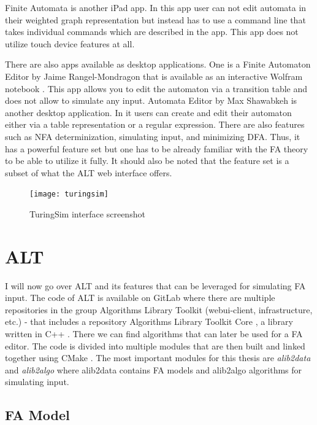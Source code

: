 Finite Automata \cite{finite-automata-app} is another iPad app. In this app user can not edit automata in their weighted graph representation but instead has to use a command line that takes individual commands which are described in the app. This app does not utilize touch device features at all.

There are also apps available as desktop applications. One is a Finite Automaton Editor by Jaime Rangel-Mondragon that is available as an interactive Wolfram notebook \cite{wolfram-editor}. This app allows you to edit the automaton via a transition table and does not allow to simulate any input. Automata Editor by Max Shawabkeh \cite{automata-editor-max} is another desktop application. In it users can create and edit their automaton either via a table representation or a regular expression. There are also features such as NFA determinization, simulating input, and minimizing DFA. Thus, it has a powerful feature set but one has to be already familiar with the FA theory to be able to utilize it fully. It should also be noted that the feature set is a subset of what the ALT web interface offers.

\begin{figure}
    \texttt{[image: turingsim]}
    \caption{TuringSim interface screenshot}\label{turingsim-screen}
\end{figure}

\section{ALT}

I will now go over ALT and its features that can be leveraged for simulating FA input. The code of ALT is available on GitLab \cite{gitlab} where there are multiple repositories in the group Algorithms Library Toolkit (webui-client, infrastructure, etc.) - that includes a repository Algorithms Library Toolkit Core \cite{alt-code}, a library written in C++ \cite{c++}. There we can find algorithms that can later be used for a FA editor. The code is divided into multiple modules that are then built and linked together using CMake \cite{cmake}. The most important modules for this thesis are \textit{alib2data} and \textit{alib2algo} where alib2data contains FA models and alib2algo algorithms for simulating input.

\subsection{FA Model}

